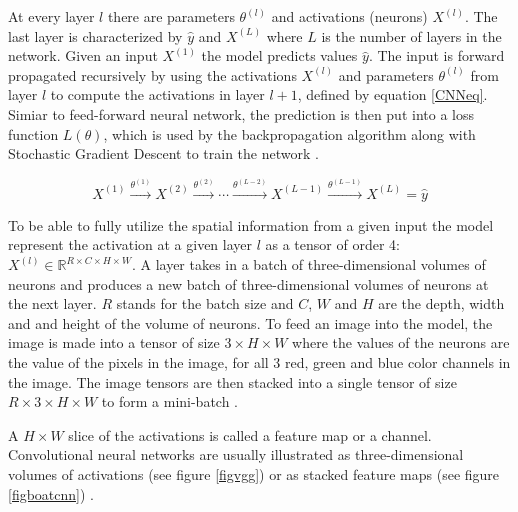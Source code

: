 \documentclass[a4paper, twoside]{article}
\begin{document}
At every layer $l$ there are parameters $\theta^{(l)}$ and activations (neurons) $X^{(l)}$. The last layer is characterized by $\hat{y}$ and $X^{(L)}$ where $L$ is the number of layers in the network. Given an input $X^{(1)}$ the model predicts values $\hat{y}$. The input is forward propagated recursively by using the activations $X^{(l)}$ and parameters $\theta^{(l)}$ from layer $l$ to compute the activations in layer $l+1$, defined by equation \eqref{CNNeq}. Simiar to feed-forward neural network, the prediction is then put into a loss function $L(\theta)$, which is used by the backpropagation algorithm along with Stochastic Gradient Descent to train the network \cite{cs231n} \cite{convmath}.

\begin{equation}\label{CNNeq}
X^{(1)} \xrightarrow{\theta^{(1)}} X^{(2)}  \xrightarrow{\theta^{(2)}} \cdots  \xrightarrow{\theta^{(L-2)}} X^{(L-1)}  \xrightarrow{\theta^{(L-1)}} X^{(L)} = \hat{y}
\end{equation}

To be able to fully utilize the spatial information from a given input the model represent the activation at a given layer $l$ as a tensor of order 4: $X^{(l)} \in \mathbb{R}^{R \times C  \times H \times W}$. A layer takes in a batch of three-dimensional volumes of neurons and produces a new batch of three-dimensional volumes of neurons at the next layer. $R$ stands for the batch size and $C$, $W$ and $H$ are the depth, width and and height of the volume of neurons. To feed an image into the model, the image is made into a tensor of size $3 \times H \times W$ where the values of the neurons are the value of the pixels in the image, for all 3 red, green and blue color channels in the image. The image tensors are then stacked into a single tensor of size $R \times 3 \times H \times W$ to form a mini-batch \cite{cs231n}.

A $H \times W$ slice of the activations is called a feature map or a channel. Convolutional neural networks are usually illustrated as three-dimensional volumes of activations (see figure \ref{figvgg}) or as stacked feature maps (see figure \ref{figboatcnn}) \cite{cs231n} \cite{convmath} \cite{convarithmetic}. 
\end{document}
